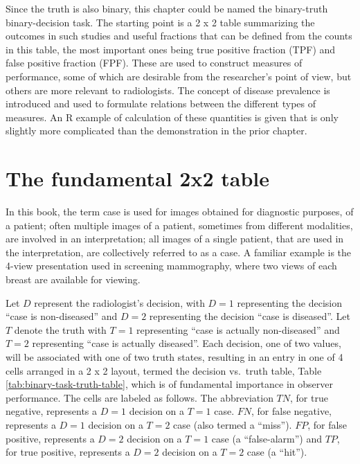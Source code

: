 \documentclass[
]{book}
\begin{document}
Since the truth is also binary, this chapter could be named the binary-truth binary-decision task. The starting point is a 2 x 2 table summarizing the outcomes in such studies and useful fractions that can be defined from the counts in this table, the most important ones being true positive fraction (TPF) and false positive fraction (FPF). These are used to construct measures of performance, some of which are desirable from the researcher's point of view, but others are more relevant to radiologists. The concept of disease prevalence is introduced and used to formulate relations between the different types of measures. An R example of calculation of these quantities is given that is only slightly more complicated than the demonstration in the prior chapter.

\hypertarget{binary-taskTruth}{%
\section{The fundamental 2x2 table}\label{binary-taskTruth}}

In this book, the term case is used for images obtained for diagnostic purposes, of a patient; often multiple images of a patient, sometimes from different modalities, are involved in an interpretation; all images of a single patient, that are used in the interpretation, are collectively referred to as a case. A familiar example is the 4-view presentation used in screening mammography, where two views of each breast are available for viewing.

Let \(D\) represent the radiologist's decision, with \(D=1\) representing the decision ``case is non-diseased'' and \(D=2\) representing the decision ``case is diseased''. Let \(T\) denote the truth with \(T=1\) representing ``case is actually non-diseased'' and \(T=2\) representing ``case is actually diseased''. Each decision, one of two values, will be associated with one of two truth states, resulting in an entry in one of 4 cells arranged in a 2 x 2 layout, termed the decision vs.~truth table, Table \ref{tab:binary-task-truth-table}, which is of fundamental importance in observer performance. The cells are labeled as follows. The abbreviation \(TN\), for true negative, represents a \(D=1\) decision on a \(T=1\) case. \(FN\), for false negative, represents a \(D=1\) decision on a \(T=2\) case (also termed a ``miss''). \(FP\), for false positive, represents a \(D=2\) decision on a \(T=1\) case (a ``false-alarm'') and \(TP\), for true positive, represents a \(D=2\) decision on a \(T=2\) case (a ``hit'').
\end{document}

